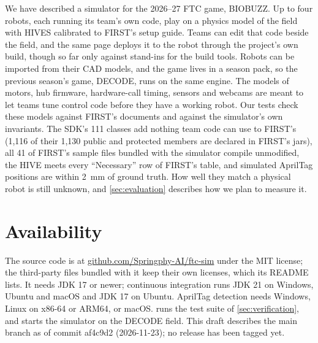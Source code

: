 \documentclass[10pt,twocolumn,letterpaper]{article}
\begin{document}
We have described a simulator for the 2026–27 FTC game, BIOBUZZ. Up to four robots, each running its team's own code, play on a physics model of the field with HIVES calibrated to FIRST's setup guide. Teams can edit that code beside the field, and the same page deploys it to the robot through the project's own build, though so far only against stand-ins for the build tools. Robots can be imported from their CAD models, and the game lives in a season pack, so the previous season's game, DECODE, runs on the same engine. The models of motors, hub firmware, hardware-call timing, sensors and webcams are meant to let teams tune control code before they have a working robot. Our tests check these models against FIRST's documents and against the simulator's own invariants. The SDK's 111 classes add nothing team code can use to FIRST's (1,116 of their 1,130 public and protected members are declared in FIRST's jars), all 41 of FIRST's sample files bundled with the simulator compile unmodified, the HIVE meets every “Necessary” row of FIRST's table, and simulated AprilTag positions are within 2~mm of ground truth. How well they match a physical robot is still unknown, and \cref{sec:evaluation} describes how we plan to measure it.

\section*{Availability}

The source code is at \href{https://github.com/Springphy-AI/ftc-sim}{github.com/Springphy-AI/ftc-sim} under the MIT license; the third-party files bundled with it keep their own licenses, which its README lists. It needs JDK 17 or newer; continuous integration runs JDK 21 on Windows, Ubuntu and macOS and JDK 17 on Ubuntu. AprilTag detection needs Windows, Linux on x86-64 or ARM64, or macOS.  runs the test suite of \cref{sec:verification}, and  starts the simulator on the DECODE field. This draft describes the main branch as of commit af4c9d2 (2026-11-23); no release has been tagged yet.



\end{document}
